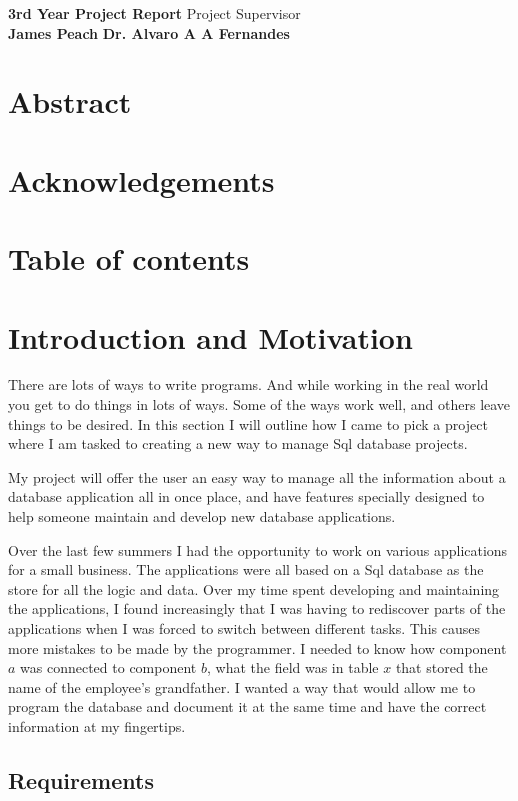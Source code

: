 \documentclass[a4paper, 11pt]{article}
\begin{document}
\noindent\large\textbf{3rd Year Project Report} \hfill \normalsize Project Supervisor  \\
\textbf{James Peach}  \hfill
\textbf{Dr. Alvaro A A Fernandes}\hfill

\section*{Abstract}

\section*{Acknowledgements}

\section*{Table of contents}

\section{Introduction and Motivation}

There are lots of ways to write programs. And while working in the real world
you get to do things in lots of ways. Some of the ways work well, and others
leave things to be desired. In this section I will outline how I came  to pick a
project where I am tasked to creating a new way to manage Sql database projects.

My project will offer the user an easy way to manage all the information about
a database application all in once place, and have features specially designed to
help someone maintain and develop new database applications.

Over the last few summers I had the opportunity to work on various applications
for a small business. The applications were all based on a Sql database as the
store for all the logic and data. Over my time spent developing and maintaining
the applications, I found increasingly that I was having to rediscover parts of
the applications when I was forced to switch between different tasks. This
causes more mistakes to be made by the programmer. I needed to know how
component $a$ was connected to component $b$, what the field was in table $x$
that stored the name of the employee's grandfather. I wanted a way that would
allow me to program the database and document it at the same time and
have the correct information at my fingertips.

\subsection{Requirements}
\end{document}

